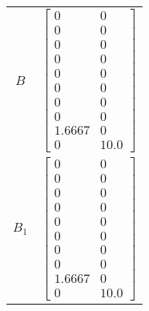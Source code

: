 \begin{tabular}{cl}
   $B$    & $\left[\begin{matrix}0 & 0\\0 & 0\\0 & 0\\0 & 0\\0 & 0\\0 & 0\\0 & 0\\0 & 0\\1.6667 & 0\\0 & 10.0\end{matrix}\right]$                                                                                                                                                                                                                                                                                                                                                                                                                                                                                                                                                                                                                                                                                                         \\
 $B_{1}$  & $\left[\begin{matrix}0 & 0\\0 & 0\\0 & 0\\0 & 0\\0 & 0\\0 & 0\\0 & 0\\0 & 0\\1.6667 & 0\\0 & 10.0\end{matrix}\right]$                                                                                                                                                                                                                                                                                                                                                                                                                                                                                                                                                                                                                                                                                                         \\

\end{tabular}
